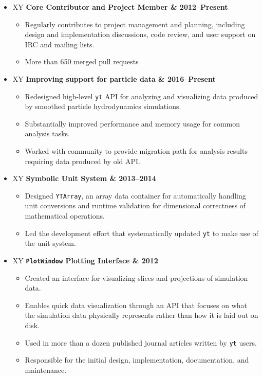 \documentclass[10pt,letterpaper]{article}
\newcommand{\textline}[2]{
  \begin{tabularx}{\textwidth}{XY}
  #1 & #2
  \end{tabularx}
}
\begin{document}
\begin{itemize}

\item[] \textline{\bf Core Contributor and Project Member}{2012--Present}
  \begin{itemize}
    \item Regularly contributes to project management and planning, including
      design and implementation discussions, code review, and user support on
      IRC and mailing lists.
    \item More than 650 merged pull requests
  \end{itemize}

\item[] \textline{\bf Improving support for particle data}{2016--Present}
  \begin{itemize}
  \item Redesigned high-level \texttt{yt} API for analyzing and visualizing data
    produced by smoothed particle hydrodynamics simulations.
  \item Substantially improved performance and memory usage for common analysis
    tasks.
  \item Worked with community to provide migration path for analysis results
    requiring data produced by old API.\@
  \end{itemize}

\item[] \textline{\bf Symbolic Unit System}{2013--2014}
  \begin{itemize}
    \item Designed \texttt{YTArray}, an array data container for automatically
      handling unit conversions and runtime validation for dimensional correctness
      of mathematical operations.
    \item Led the development effort that systematically updated \texttt{yt} to
      make use of the unit system.
  \end{itemize}

  \clearpage

\item[] \textline{\bf \texttt{PlotWindow} Plotting Interface}{2012}
  \begin{itemize}
    \item Created an interface for visualizing slices and projections of
      simulation data.
    \item Enables quick data visualization through an API that focuses on what
      the simulation data physically represents rather than how it is laid out
      on disk.
    \item Used in more than a dozen published journal articles written by
      \texttt{yt} users.
    \item Responsible for the initial design, implementation, documentation, and maintenance.
  \end{itemize}

\end{itemize}
\end{document}
